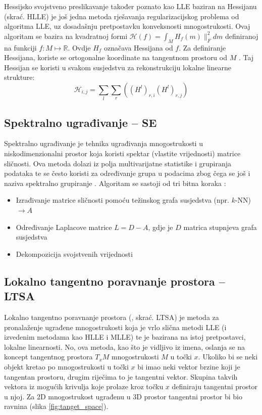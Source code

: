 \documentclass[times, utf8, diplomski]{fer}
\begin{document}
Hessijsko svojstveno preslikavanje  također poznato kao LLE baziran na Hessijanu (skrać. HLLE) je još jedna metoda rješavanja regularizacijskog problema od algoritma LLE, uz dosadašnju pretpostavku konveksnosti mnogostrukosti. Ovaj algoritam se bazira na kvadratnoj formi $\mathcal{H}(f) = \int_M H_f(m)\|_F^2 dm$ definiranoj na funkciji $f: M \mapsto \mathbb{R}$. Ovdje $H_f$ označava Hessijana od $f$. Za definiranje Hessijana, koriste se ortogonalne koordinate na tangentnom prostoru od $M$ \citep{Donoho5591}. Taj Hessijan se koristi u svakom susjedstvu za rekonstrukciju lokalne linearne strukture:
\begin{equation}
    \mathcal{H}_{i,j} = \sum_l \sum_r ((H^l)_{r,i}(H^l)_{r,j})
\end{equation}


\subsection{Spektralno ugrađivanje -- SE}
Spektralno ugrađivanje  je tehnika ugrađivanja mnogostrukosti u niskodimenzionalni prostor koja koristi spektar (vlastite vrijednosti) matrice sličnosti. Ova metoda dolazi iz polja multivarijatne statistike i grupiranja podataka te se često koristi za određivanje grupa u podacima zbog čega se još i naziva spektralno grupiranje . Algoritam se sastoji od tri bitna koraka \citep{belkin2003laplacian}:
\begin{itemize}
    \item Izrađivanje matrice sličnosti pomoću težinskog grafa susjedstva (npr. $k$-NN) $\rightarrow A$
    \item Određivanje Laplacove matrice $L = D - A$, gdje je $D$ matrica stupnjeva grafa susjedstva
    \item Dekompozicija svojstvenih vrijednosti 
\end{itemize}

\subsection{Lokalno tangentno poravnanje prostora -- LTSA}

Lokalno tangentno poravnanje prostora (, skrać. LTSA) je metoda za pronalaženje ugrađene mnogostrukosti koja je vrlo slična metodi LLE (i izvedenim metodama kao HLLE i MLLE) te je bazirana na istoj pretpostavci, lokalne linearnosti. No, ova metoda, kao što je vidljivo iz imena, oslanja se na koncept tangentnog prostora $T_xM$ mnogostrukosti $M$ u točki $x$. Ukoliko bi se neki objekt kretao po mnogostrukosti u točki $x$ bi imao neki vektor brzine koji je tangentan prostoru, drugim riječima to je tangentni vektor. Skupina takvih vektora iz mogućih krivulja koje prolaze kroz točku $x$ definiraju tangentni prostor u njoj. Za 2D mnogostrukost ugrađenu u 3D prostor tangentni prostor bi bio ravnina (slika \ref{fig:tanget_space}).
\end{document}
